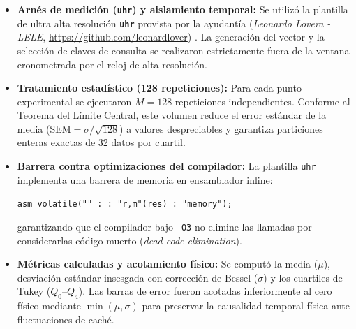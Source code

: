 \documentclass[11pt,letterpaper]{article}
\begin{document}
\begin{itemize}
    \item \textbf{Arnés de medición (\texttt{uhr}) y aislamiento temporal:} Se utilizó la plantilla de ultra alta resolución \textbf{\texttt{uhr}} provista por la ayudantía (\textit{Leonardo Lovera - LELE}, \url{https://github.com/leonardlover}) \cite{lovera_github, jfuentess_edaa}. La generación del vector y la selección de claves de consulta se realizaron estrictamente fuera de la ventana cronometrada por el reloj de alta resolución.
    
    \item \textbf{Tratamiento estadístico (128 repeticiones):} Para cada punto experimental se ejecutaron $M = 128$ repeticiones independientes. Conforme al Teorema del Límite Central, este volumen reduce el error estándar de la media ($\text{SEM} = \sigma / \sqrt{128}$) a valores despreciables y garantiza particiones enteras exactas de 32 datos por cuartil.
    
    \item \textbf{Barrera contra optimizaciones del compilador:} La plantilla \texttt{uhr} implementa una barrera de memoria en ensamblador inline:
    \begin{center}
    \verb|asm volatile("" : : "r,m"(res) : "memory");|
    \end{center}
    garantizando que el compilador bajo \texttt{-O3} no elimine las llamadas por considerarlas código muerto (\textit{dead code elimination}).
    
    \item \textbf{Métricas calculadas y acotamiento físico:} Se computó la media ($\mu$), desviación estándar insesgada con corrección de Bessel ($\sigma$) y los cuartiles de Tukey ($Q_0\text{--}Q_4$). Las barras de error fueron acotadas inferiormente al cero físico mediante $\min(\mu, \sigma)$ para preservar la causalidad temporal física ante fluctuaciones de caché.
\end{itemize}
\end{document}

